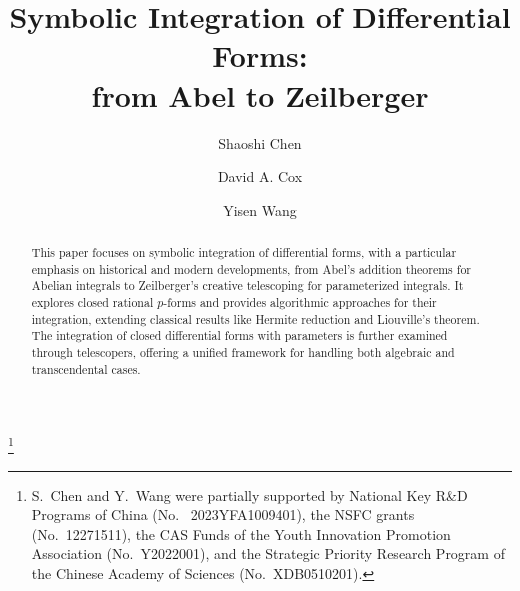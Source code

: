 \documentclass{amsart}
\theoremstyle{definition}
\numberwithin{equation}{section}
\numberwithin{thm}{section}
\begin{document}
\title[Symbolic Integration of Differential Forms]{Symbolic Integration of Differential Forms:\\ from Abel to Zeilberger}

\thanks{S.\ Chen and Y.\ Wang were partially supported by
National Key R\&D Programs of China (No.~ 2023YFA1009401), the NSFC grants (No.~12271511), the
CAS Funds of the Youth Innovation Promotion Association (No.~Y2022001),
and the Strategic Priority Research Program of the Chinese Academy of
Sciences (No.~XDB0510201).}

\author{Shaoshi Chen}
\address{KLMM,\, Academy of Mathematics and Systems Science, Chinese Academy of Sciences, {\it and }School of Mathematics, University of Chinese Academy of Sciences, Beijing, 100190, China}

\author{David A. Cox}
\address{Department of Mathematics, Amherst College, Amherst, MA 01002, USA}

\author{Yisen Wang}
\address{KLMM,\, Academy of Mathematics and Systems Science, Chinese Academy of Sciences, {\it and }School of Mathematics, University of Chinese Academy of Sciences, Beijing, 100190, China}

\begin{abstract}
This paper focuses on  symbolic integration of differential forms, with a particular emphasis on historical and modern developments, from Abel's addition theorems for Abelian integrals to Zeilberger's creative telescoping for parameterized integrals. It explores closed rational $p$-forms and provides algorithmic approaches for their integration, extending classical results like Hermite reduction and Liouville's theorem. The integration of closed differential forms with parameters is further examined through telescopers, offering a unified framework for handling both algebraic and transcendental cases.
\end{abstract}


\maketitle
\end{document}

